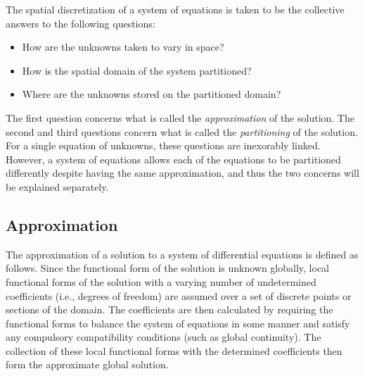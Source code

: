 \documentclass[12pt]{../UWMadThesis}
\begin{document}
The spatial discretization of a system of equations is taken to be the collective answers to the following questions:
\begin{itemize}[topsep=-0.40\parskip]
	\item{How are the unknowns taken to vary in space?}
    \item{How is the spatial domain of the system partitioned?}
    \item{Where are the unknowns stored on the partitioned domain?}
\end{itemize}
The first  question concerns what is called the \emph{approximation} of the solution.
The second and third questions concern what is called the \emph{partitioning} of the solution.
For a single equation of unknowns, these questions are inexorably linked.
However, a system of equations allows each of the equations to be partitioned differently despite having the same approximation, and thus the two concerns will be explained separately.


\subsection{Approximation}

The approximation of a solution to a system of differential equations is defined as follows.
Since the functional form of the solution is unknown globally, local functional forms of the solution with a varying number of undetermined coefficients (i.e., degrees of freedom) are assumed over a set of discrete points or sections of the domain.
The coefficients are then calculated by requiring the functional forms to balance the system of equations in some manner and satisfy any compulsory compatibility conditions (such as global continuity).
The collection of these local functional forms with the determined coefficients then form the approximate global solution.
\end{document}
